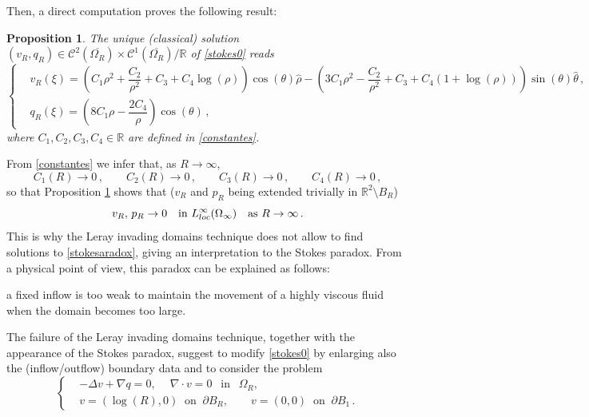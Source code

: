 \documentclass[a4paper,11pt]{article}
\newtheorem{proposition}[theorem]{Proposition}
\numberwithin{equation}{section}
\numberwithin{figure}{section}
\newcommand{\R}{\mathbb{R}}
\begin{document}
Then, a direct computation proves the following result:
\begin{proposition} \label{exactstokes}
The unique (classical) solution $(v_R,q_R)\in\mathcal{C}^{2}(\overline{\Omega_{R}}) \times \mathcal{C}^{1}(\overline{\Omega_{R}})/\mathbb{R}$  of \eqref{stokes0} reads
	$$
	\left\{
	\begin{aligned}
		& v_{R}(\xi) =  \left( C_{1} \rho^{2} + \dfrac{C_{2}}{\rho^{2}} + C_{3} + C_{4} \log(\rho) \right) \cos(\theta) \widehat{\rho} -
\left( 3 C_{1} \rho^{2} - \dfrac{C_{2}}{\rho^{2}} + C_{3} + C_{4} (1+ \log(\rho)) \right) \sin(\theta) \widehat{\theta} \, , \\[6pt]
		& q_R(\xi) =   \left( 8C_1 \rho - \dfrac{2 C_4}{\rho} \right) \cos(\theta) \, ,
	\end{aligned}
	\right.
	$$
	where $C_1, C_2, C_3, C_4 \in \mathbb{R}$ are defined in
\eqref{constantes}.
\end{proposition}

From \eqref{constantes} we infer that, as $R\to\infty$,
\begin{equation}\label{todos0}
C_1(R) \to 0 \, ,\qquad C_2(R)\to0 \,,\qquad C_3(R)\to0\,,\qquad C_4(R)\to0\,,
\end{equation}
so that Proposition \ref{exactstokes} shows that ($v_R$ and $p_R$ being extended trivially in $\R^2\setminus B_R$)
$$
v_R, \, p_R\to0\quad\mbox{in }L^\infty_{\rm loc}(\Omega_\infty)\quad\mbox{as }R\to\infty\, .
$$
This is why the Leray
invading domains technique \cite{leray1933etude} does not allow to find solutions to \eqref{stokesaradox},
giving an interpretation to the Stokes paradox. From a physical point of view, this paradox can be explained as follows:
\begin{center}
a fixed inflow is too weak to maintain the movement of a highly viscous fluid\\
when the domain becomes too large.
\end{center}
The failure of the Leray invading domains technique, together with the appearance of the Stokes paradox, suggest to modify \eqref{stokes0}
by enlarging also the (inflow/outflow) boundary data and to consider the problem
\begin{equation}\label{stokes1}
\left\{
\begin{aligned}
	& -\Delta v+\nabla q=0,\ \quad  \nabla\cdot v=0 \ \ \mbox{ in } \ \ \Omega_{R}, \\[3pt]
	& v = (\log (R),0) \ \text{ on } \ \partial B_R, \qquad v = (0,0) \ \text{ on } \ \partial B_{1} \, .
\end{aligned}
\right.
\end{equation}
\end{document}
